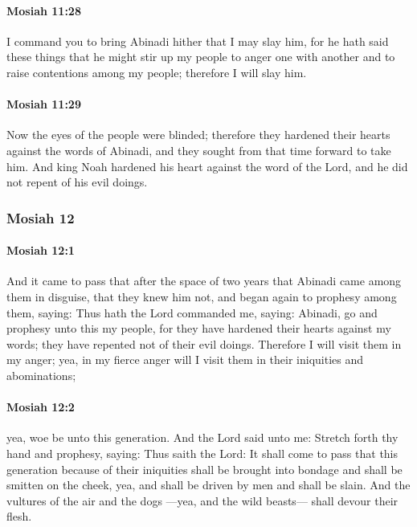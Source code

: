 		\paragraph{Mosiah 11:28} %
			\label{MOSIAH-11-28}

			I command you to bring Abinadi hither that I may slay him,
			for he hath said these things
			that he might stir up my people to anger one with another
			and to raise contentions among my people;
			therefore I will slay him.

		\paragraph{Mosiah 11:29} %
			\label{MOSIAH-11-29}

			Now the eyes of the people were blinded;
			therefore they hardened their hearts against the words of Abinadi,
			and they sought from that time forward to take him.
			And king Noah hardened his heart against the word of the Lord,
			and he did not repent of his evil doings.

	\subsubsection{Mosiah 12} %
		\label{MOSIAH-12}
		
		\paragraph{Mosiah 12:1} %
			\label{MOSIAH-12-1}

			And it came to pass that after the space of two years
			that Abinadi came among them in disguise,
			that they knew him not,
			and began again to prophesy among them, saying:
			Thus hath the Lord commanded me, saying:
			Abinadi, go and prophesy unto this my people,
			for they have hardened their hearts against my words;
			they have repented not of their evil doings.
			Therefore I will visit them in my anger;
			yea, in my fierce anger will I visit them in their iniquities and abominations;

		\paragraph{Mosiah 12:2} %
			\label{MOSIAH-12-2}

			yea, woe be unto this generation.
			And the Lord said unto me:
			Stretch forth thy hand and prophesy, saying:
			Thus saith the Lord:
			It shall come to pass that this generation because of their iniquities
			shall be brought into bondage and shall be smitten on the cheek,
			yea, and shall be driven by men and shall be slain.
			And the vultures of the air and the dogs
			---yea, and the wild beasts---
			shall devour their flesh.

